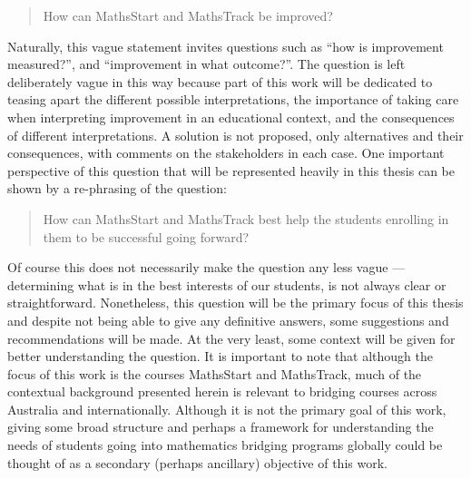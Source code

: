 \documentclass[twoside,12pt,a4paper]{report}
\begin{document}
\begin{quote}
	How can MathsStart and MathsTrack be improved?
\end{quote}

Naturally, this vague statement invites questions such as ``how is improvement measured?'', and ``improvement in what outcome?''. The question is left deliberately vague in this way because part of this work will be dedicated to teasing apart the different possible interpretations, the importance of taking care when interpreting improvement in an educational context, and the consequences of different interpretations. A solution is not proposed, only alternatives and their consequences, with comments on the stakeholders in each case. One important perspective of this question that will be represented heavily in this thesis can be shown by a re-phrasing of the question: 

\begin{quote}
	How can MathsStart and MathsTrack best help the students enrolling in them to be successful going forward?
\end{quote}

Of course this does not necessarily make the question any less vague --- determining what is in the best interests of our students, is not always clear or straightforward. Nonetheless, this question will be the primary focus of this thesis and despite not being able to give any definitive answers, some suggestions and recommendations will be made. At the very least, some context will be given for better understanding the question. It is important to note that although the focus of this work is the courses MathsStart and MathsTrack, much of the contextual background presented herein is relevant to bridging courses across Australia and internationally. Although it is not the primary goal of this work, giving some broad structure and perhaps a framework for understanding the needs of students going into mathematics bridging programs globally could be thought of as a secondary (perhaps ancillary) objective of this work.
\end{document}
